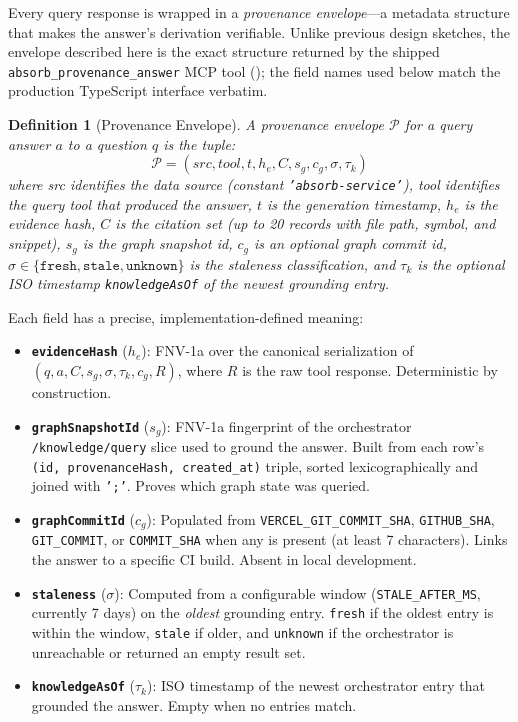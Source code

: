 \documentclass[conference]{IEEEtran}
\newtheorem{definition}{Definition}
\begin{document}
Every query response is wrapped in a \emph{provenance envelope}---a
metadata structure that makes the answer's derivation verifiable. Unlike
previous design sketches, the envelope described here is the exact
structure returned by the shipped
\texttt{absorb\_provenance\_answer} MCP tool
(); the field names used below match the
production TypeScript interface verbatim.

\begin{definition}[Provenance Envelope]
A provenance envelope $\mathcal{P}$ for a query answer $a$ to a question
$q$ is the tuple:
\begin{equation}
  \mathcal{P} = (\textit{src}, \textit{tool}, t, h_e, C, s_g, c_g, \sigma, \tau_k)
  \label{eq:envelope}
\end{equation}
where \textit{src} identifies the data source (constant
\texttt{'absorb-service'}), \textit{tool} identifies the query tool
that produced the answer, $t$ is the generation timestamp, $h_e$ is the
\emph{evidence hash}, $C$ is the citation set (up to 20 records with
file path, symbol, and snippet), $s_g$ is the
\emph{graph snapshot id}, $c_g$ is an optional \emph{graph commit id},
$\sigma \in \{\texttt{fresh}, \texttt{stale}, \texttt{unknown}\}$ is the
\emph{staleness} classification, and $\tau_k$ is the optional ISO
timestamp \texttt{knowledgeAsOf} of the newest grounding entry.
\end{definition}

Each field has a precise, implementation-defined meaning:

\begin{itemize}
  \item \textbf{\texttt{evidenceHash}} ($h_e$): FNV-1a over the canonical
    serialization of $(q, a, C, s_g, \sigma, \tau_k, c_g, R)$, where $R$
    is the raw tool response. Deterministic by construction.
  \item \textbf{\texttt{graphSnapshotId}} ($s_g$): FNV-1a fingerprint of
    the orchestrator \texttt{/knowledge/query} slice used to ground the
    answer. Built from each row's \texttt{(id, provenanceHash,
    created\_at)} triple, sorted lexicographically and joined with
    \texttt{';'}. Proves which graph state was queried.
  \item \textbf{\texttt{graphCommitId}} ($c_g$): Populated from
    \texttt{VERCEL\_GIT\_COMMIT\_SHA}, \texttt{GITHUB\_SHA},
    \texttt{GIT\_COMMIT}, or \texttt{COMMIT\_SHA} when any is present
    (at least 7 characters). Links the answer to a specific CI build.
    Absent in local development.
  \item \textbf{\texttt{staleness}} ($\sigma$): Computed from a
    configurable window (\texttt{STALE\_AFTER\_MS}, currently 7 days)
    on the \emph{oldest} grounding entry. \texttt{fresh} if the oldest
    entry is within the window, \texttt{stale} if older, and
    \texttt{unknown} if the orchestrator is unreachable or returned an
    empty result set.
  \item \textbf{\texttt{knowledgeAsOf}} ($\tau_k$): ISO timestamp of
    the newest orchestrator entry that grounded the answer. Empty when
    no entries match.
\end{itemize}
\end{document}
